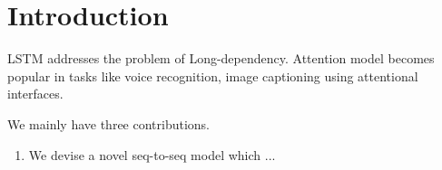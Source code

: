 \section{Introduction}
LSTM addresses the problem of Long-dependency.
Attention model becomes popular in tasks like voice recognition, image captioning using attentional interfaces.

 We mainly have three contributions.
\begin{enumerate}
\item We devise a novel seq-to-seq model which ...
\end{enumerate} 